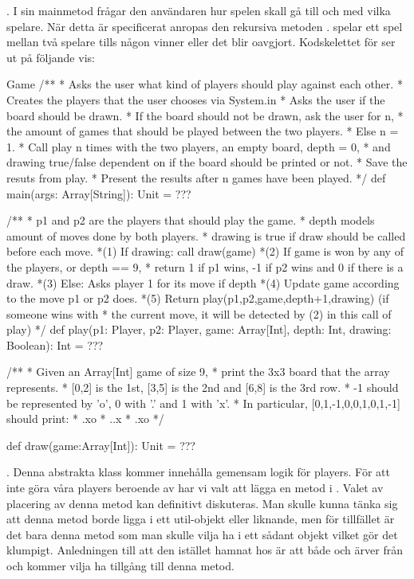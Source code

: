 . I sin mainmetod frågar den användaren hur spelen skall gå till och med vilka spelare.
När detta är specificerat anropas den rekursiva metoden .
 spelar ett spel mellan två spelare tills någon vinner eller det blir oavgjort.
Kodskelettet för  ser ut på följande vis:
\begin{ScalaSpec}{Game}
/**
 * Asks the user what kind of players should play against each other.
 * Creates the players that the user chooses via System.in
 * Asks the user if the board should be drawn.
 * If the board should not be drawn, ask the user for n,
 * the amount of games that should be played between the two players.
 * Else n = 1.
 * Call play n times with the two players, an empty board, depth = 0,
 * and drawing true/false dependent on if the board should be printed or not.
 * Save the resuts from play.
 * Present the results after n games have been played.
 */
def main(args: Array[String]): Unit = ???

/**
 * p1 and p2 are the players that should play the game.
 * depth models amount of moves done by both players.
 * drawing is true if draw should be called before each move.
 *(1) If drawing: call draw(game)
 *(2) If game is won by any of the players, or depth == 9,
 * return 1 if p1 wins, -1 if p2 wins and 0 if there is a draw.
 *(3) Else: Asks player 1 for its move if depth%
 *(4) Update game according to the move p1 or p2 does.
 *(5) Return play(p1,p2,game,depth+1,drawing) (if someone wins with
 * the current move, it will be detected by (2) in this call of play)
 */
def play(p1: Player, p2: Player, game: Array[Int],
         depth: Int, drawing: Boolean): Int = ???

/**
 * Given an Array[Int] game of size 9,
 * print the 3x3 board that the array represents.
 * [0,2] is the 1st, [3,5] is the 2nd and [6,8] is the 3rd row.
 * -1 should be represented by 'o', 0 with '.' and 1 with 'x'.
 * In particular, [0,1,-1,0,0,1,0,1,-1] should print:
 * .xo
 * ..x
 * .xo
 */

def draw(game:Array[Int]): Unit = ???
\end{ScalaSpec}

. Denna abstrakta klass kommer innehålla gemensam logik för players. För att inte göra våra players beroende av har vi valt att lägga en metod  i . Valet av placering av denna metod kan definitivt diskuteras. Man skulle kunna tänka sig att denna metod borde ligga i ett util-objekt eller liknande, men för tillfället är det bara denna metod som man skulle vilja ha i ett sådant objekt vilket gör det klumpigt. Anledningen till att den istället hamnat hos  är att både  och  ärver från  och kommer vilja ha tillgång till denna metod.

